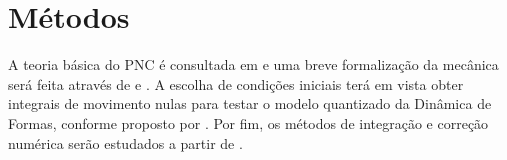 \section{Métodos}

A teoria básica do PNC é consultada em \cite{volchan_uma_2021} e uma breve formalização da mecânica será feita através de \cite{arnold_mathematical_1989} e \cite{lopes_introducao_2013}. A escolha de condições iniciais terá em vista obter integrais de movimento nulas para testar o modelo quantizado da Dinâmica de Formas, conforme proposto por \cite{barbour_identification_2014}. Por fim, os métodos de integração e correção numérica serão estudados a partir de \cite{ernst_heirer_geometric_2006}. 
